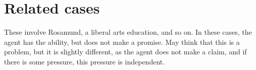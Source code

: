 \documentclass[10pt]{article}
\begin{document}
\section{Related cases}
\label{sec:related-cases}

These involve Rosamund, a liberal arts education, and so on.
In these cases, the agent has the ability, but does not make a promise.
May think that this is a problem, but it is slightly different, as the agent does not make a claim, and if there is some pressure, this pressure is independent.


\newpage

\printbibliography
\end{document}
